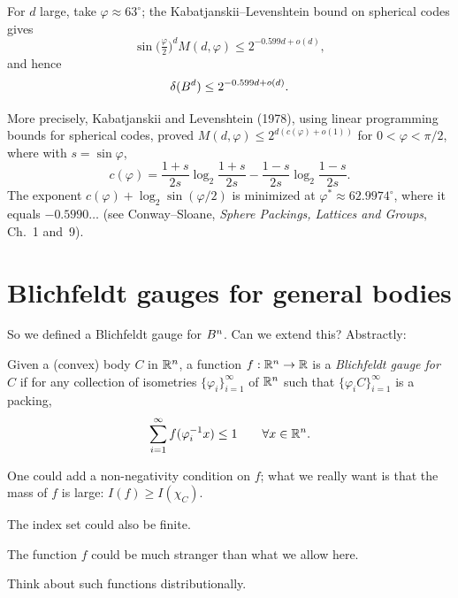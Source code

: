 For $d$ large, take $\varphi\approx63^\circ$; the Kabatjanskii--Levenshtein bound on spherical codes gives
\[
  \sin\bigl(\tfrac\varphi2\bigr)^d M(d,\varphi)\le 2^{-0.599d+o(d)},
\]
and hence
\[
  \delta(B^d)\le 2^{-0.599d+o(d)}.
\]
\begin{addedblock}
More precisely, Kabatjanskii and Levenshtein (1978), using linear programming bounds for spherical codes, proved
$M(d,\varphi)\le 2^{d(c(\varphi)+o(1))}$ for $0<\varphi<\pi/2$, where with $s=\sin\varphi$,
\[
  c(\varphi)=\frac{1+s}{2s}\log_2\frac{1+s}{2s}-\frac{1-s}{2s}\log_2\frac{1-s}{2s}.
\]
The exponent $c(\varphi)+\log_2\sin(\varphi/2)$ is minimized at $\varphi^*\approx 62.9974^\circ$, where it equals $-0.5990\ldots$
(see Conway--Sloane, \emph{Sphere Packings, Lattices and Groups}, Ch.~1 and~9).
\end{addedblock}

\section{Blichfeldt gauges for general bodies}
\label{L3:sec:general}

So we defined a Blichfeldt gauge for $B^n$. Can we extend this? Abstractly:

\begin{definition}\label{L3:def:gauge}
Given a (convex) body $C$ in $\mathbb{R}^n$, a function $f:\mathbb{R}^n\to\mathbb{R}$ is a \emph{Blichfeldt gauge for $C$} if for any collection of
isometries $\{\varphi_i\}_{i=1}^\infty$ of $\mathbb{R}^n$ such that $\{\varphi_iC\}_{i=1}^\infty$ is a packing,
\[
  \sum_{i=1}^\infty f(\varphi_i^{-1}x)\le 1\qquad\forall x\in\mathbb{R}^n.
\]
\end{definition}

\begin{remark}
One could add a non-negativity condition on $f$; what we really want is that the mass of $f$ is large: $I(f)\ge I(\chi_C)$.
\end{remark}
\begin{remark}
The index set could also be finite.
\end{remark}
\begin{remark}
The function $f$ could be much stranger than what we allow here.
\end{remark}
\begin{exercise}[$\ast\ast\ast$]
Think about such functions distributionally.
\end{exercise}

